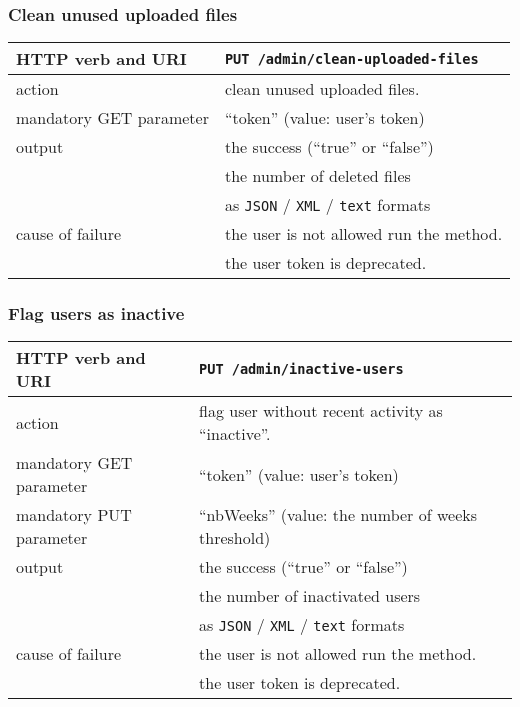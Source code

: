 \subsubsection{Clean unused uploaded files}
\begin{tabular}{ | l | l | }
	\hline
	HTTP verb and URI & \texttt{PUT /admin/clean-uploaded-files} \\
	\hline
	action & clean unused uploaded files. \\
	\hline
	mandatory GET parameter & ``token'' (value: user's token) \\
	\hline
	output & the success (``true'' or ``false'') \\
	\space & the number of deleted files \\
	\space & as \texttt{JSON} / \texttt{XML} / \texttt{text} formats \\
	\hline
	cause of failure & the user is not allowed run the method. \\
	\space & the user token is deprecated. \\
	\hline
\end{tabular}
\newline

\subsubsection{Flag users as inactive}
\begin{tabular}{ | l | l | }
	\hline
	HTTP verb and URI & \texttt{PUT /admin/inactive-users} \\
	\hline
	action & flag user without recent activity as ``inactive''. \\
	\hline
	mandatory GET parameter & ``token'' (value: user's token) \\
	\hline
	mandatory PUT parameter & ``nbWeeks'' (value: the number of weeks threshold) \\
	\hline
	output & the success (``true'' or ``false'') \\
	\space & the number of inactivated users \\
	\space & as \texttt{JSON} / \texttt{XML} / \texttt{text} formats \\
	\hline
	cause of failure & the user is not allowed run the method. \\
	\space & the user token is deprecated. \\
	\hline
\end{tabular}
\newline

